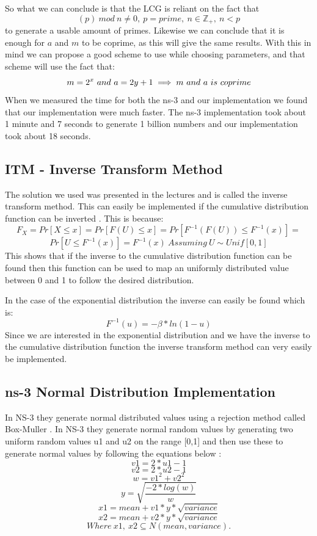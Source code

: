 \documentclass{article}
\begin{document}
    So what we can conclude is that the LCG is reliant on the fact that
    \begin{equation}
      (p)\ mod\ n \neq 0,\ p = prime,\ n \in \mathbb{Z}_{+} ,\ n < p
    \end{equation}
    to generate a usable amount of primes.
    Likewise we can conclude that it is enough for $a$ and $m$ to be coprime, as this will give the same results.
    With this in mind we can propose a good scheme to use while choosing parameters, and that scheme will use the fact that:
    \begin{equation}
      m = 2^{x}\ and\ a = 2y+1 \implies m\ and\ a\ is\ coprime \\
    \end{equation}
    When we measured the time for both the ns-3 and our implementation we found that our implementation were much faster.
    The ns-3 implementation took about 1 minute and 7 seconds to generate 1 billion numbers and our implementation took about 18 seconds.
  \subsection{ITM - Inverse Transform Method}
  The solution we used was presented in the lectures and is called the inverse transform method.
  This can easily be implemented if the cumulative distribution function can be inverted \cite{itm}.
  This is because:
  $$ F_{X}=Pr[X \leqslant x]=Pr[F(U) \leqslant x]=Pr[F^{-1}(F(U)) \leqslant F^{-1}(x)]= $$
  $$ Pr[U \leqslant F^{-1}(x)]=F^{-1}(x)\ Assuming\ U \sim Unif[0,1] $$
  This shows that if the inverse to the cumulative distribution function can be found then this function can be used to map an uniformly distributed value between 0 and 1 to follow the desired distribution.
  
  In the case of the exponential distribution the inverse can easily be found which is:
  $$ F^{-1}(u)=-\beta * ln(1-u) $$
  Since we are interested in the exponential distribution and we have the inverse to the cumulative distribution function the inverse transform method can very easily be implemented.
  
  \subsection{ns-3 Normal Distribution Implementation}
  In NS-3 they generate normal distributed values using a rejection method called Box-Muller \cite{bm}. In NS-3  they generate normal random values by generating two uniform random values u1 and u2 on the range [0,1] and then use these to generate normal values by following the equations below \cite{ns3norm}:
  $$v1 = 2 * u1 - 1$$
  $$v2 = 2 * u2 - 1$$
  $$w = v1^2 + v2^2$$
  $$y = \sqrt{\frac{-2*log(w)}{w}}$$
  $$x1 = mean + v1 * y * \sqrt{variance}$$
  $$x2 = mean + v2 * y * \sqrt{variance}$$
  $$Where\ x1,\ x2 \subseteq N(mean,variance).$$
  
\end{document}
